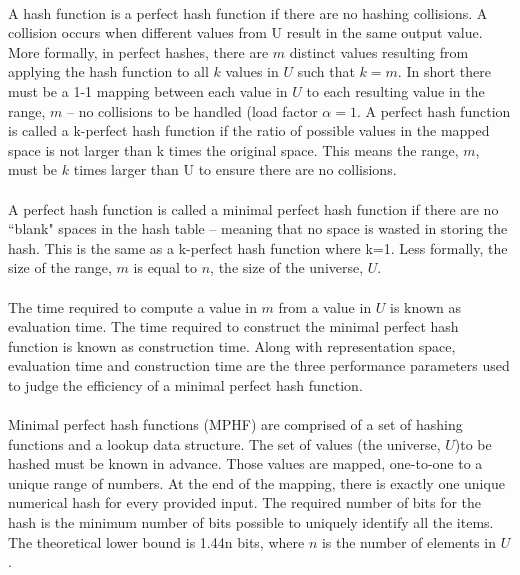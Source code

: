 			\paragraph{} A hash function is a perfect hash function if there are no hashing collisions. A collision occurs when different values from U result in the same output value. More formally, in perfect hashes, there are $m$ distinct values resulting from applying the hash function to all $k$ values in $U$ such that $k=m$.  In short there must be a 1-1 mapping between each value in $U$ to each resulting value in the range, $m$ -- no collisions to be handled (load factor $\alpha = 1$.  A perfect hash function is called a k-perfect hash function if the ratio of possible values in the mapped space is not larger than k times the original space.  This means the range, $m$, must be $k$ times larger than U to ensure there are no collisions.
			\paragraph{} A perfect hash function is called a minimal perfect hash function if there are no ``blank" spaces in the hash table -- meaning that no space is wasted in storing the hash.  This is the same as a k-perfect hash function where k=1. Less formally, the size of the range, $m$ is equal to $n$, the size of the universe, $U$.
			\paragraph{}The time required to compute a value in $m$ from a value in $U$ is known as evaluation time.  The time required to construct the minimal perfect hash function is known as construction time.  Along with representation space, evaluation time and construction time are the three performance parameters used to judge the efficiency of a minimal perfect hash function.
			\paragraph{} Minimal perfect hash functions (MPHF) are comprised of a set of hashing functions and a lookup data structure.  The set of values (the universe, $U$)to be hashed must be known in advance.  Those values are mapped, one-to-one to a unique range of numbers.  At the end of the mapping, there is exactly one unique numerical hash for every provided input.  The required number of bits for the hash is the minimum number of bits possible to uniquely identify all the items. The theoretical lower bound is 1.44n bits, where $n$ is the number of elements in $U$. 
